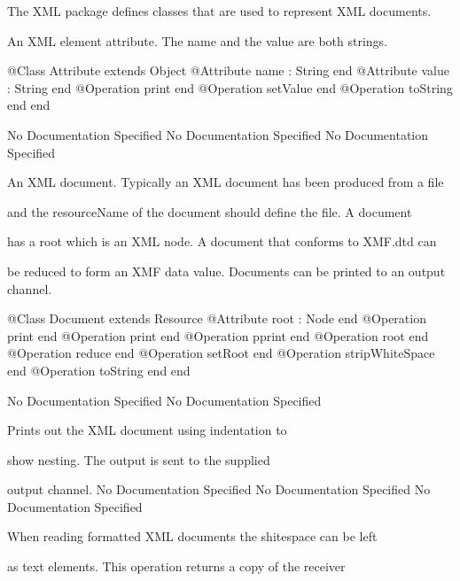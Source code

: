       The XML package defines classes that are used to represent XML documents.

      An XML element attribute. The name and the value are both strings.
\begin{Interface}
@Class Attribute extends Object
  @Attribute name : String end
  @Attribute value : String end
  @Operation print end
  @Operation setValue end
  @Operation toString end
end
\end{Interface}
No Documentation Specified
No Documentation Specified
No Documentation Specified

      An XML document. Typically an XML document has been produced from a file

      and the resourceName of the document should define the file. A document

      has a root which is an XML node. A document that conforms to XMF.dtd can

      be reduced to form an XMF data value. Documents can be printed to an 
      output channel.
\begin{Interface}
@Class Document extends Resource
  @Attribute root : Node end
  @Operation print end
  @Operation print end
  @Operation pprint end
  @Operation root end
  @Operation reduce end
  @Operation setRoot end
  @Operation stripWhiteSpace end
  @Operation toString end
end
\end{Interface}
No Documentation Specified
No Documentation Specified

        Prints out the XML document using indentation to

        show nesting. The output is sent to the supplied

        output channel.
No Documentation Specified
No Documentation Specified
No Documentation Specified

        When reading formatted XML documents the shitespace can be left

        as text elements. This operation returns a copy of the receiver

